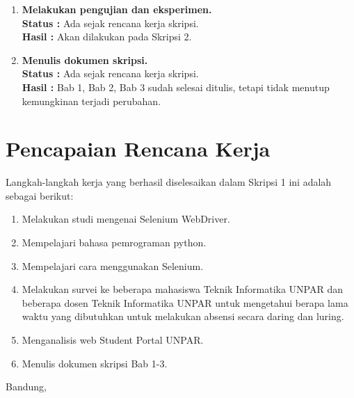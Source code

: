 \documentclass[a4paper,twoside]{article}
\begin{document}
\begin{enumerate}
		\item \textbf{Melakukan pengujian dan eksperimen.}\\
		{\bf Status :} Ada sejak rencana kerja skripsi. \\
		{\bf Hasil :} Akan dilakukan pada Skripsi 2.

		\item \textbf{Menulis dokumen skripsi.} \\
		{\bf Status :} Ada sejak rencana kerja skripsi.\\
		{\bf Hasil :} Bab 1, Bab 2, Bab 3 sudah selesai ditulis, tetapi tidak menutup kemungkinan terjadi perubahan.
		

	\end{enumerate}

\section{Pencapaian Rencana Kerja}
Langkah-langkah kerja yang berhasil diselesaikan dalam Skripsi 1 ini adalah sebagai berikut:
\begin{enumerate}
\item Melakukan studi mengenai Selenium WebDriver. 
\item Mempelajari bahasa pemrograman python.
\item Mempelajari cara menggunakan Selenium.
\item Melakukan survei ke beberapa mahasiswa Teknik Informatika UNPAR dan beberapa dosen Teknik Informatika UNPAR untuk mengetahui berapa lama waktu yang dibutuhkan untuk melakukan absensi secara daring dan luring.
\item Menganalisis web Student Portal UNPAR.
\item Menulis dokumen skripsi Bab 1-3.
\end{enumerate}



\vspace{1cm}
\centering Bandung, \tanggal\\
\vspace{2cm} \nama \\ 
\vspace{1cm}
\end{document}
